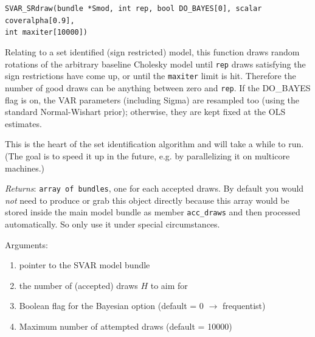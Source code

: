 \documentclass[a4paper,10pt]{article}
\newenvironment{funcdoc}[1]
{\noindent\hrulefill\newline\nopagebreak\texttt{#1}%
\nopagebreak\par\noindent\hrulefill%
\nopagebreak\par\nopagebreak\smallskip\nopagebreak\par}
{\bigskip}
\begin{document}
\begin{funcdoc}{SVAR\_SRdraw(bundle *Smod, int rep, bool
    DO\_BAYES[0], scalar coveralpha[0.9],\\
    int maxiter[10000])}
  
  Relating to a set identified (sign restricted) model, this function draws random 
  rotations of the arbitrary baseline Cholesky model
  until \texttt{rep} draws satisfying the sign restrictions have come up,
  or until the \texttt{maxiter} limit is hit. Therefore the number of good 
  draws can be anything between zero and \texttt{rep}.
  If the DO\_BAYES flag is on, the VAR parameters (including Sigma)
  are resampled too (using the standard Normal-Wishart prior); otherwise, 
  they are kept fixed at the OLS estimates. 
  
  This is the heart of the set identification algorithm 
  and will take a while to run. (The goal is to speed it up in the future, e.g. by 
  parallelizing it on multicore machines.)
  
  \emph{Returns}: \texttt{array of bundles}, one for each accepted draws. 
  By default you would \emph{not} need to produce or grab this object directly
  because this array would be stored inside the main model bundle as member 
  \texttt{acc\_draws} and then processed automatically. So only use it under 
  special circumstances.

Arguments:
\begin{enumerate}
\item pointer to the SVAR model bundle
\item the number of (accepted) draws $H$ to aim for
\item Boolean flag for the Bayesian option
  (default = 0 $\to$ frequentist)
\item Maximum number of attempted draws (default = 10000)
\end{enumerate}
\end{funcdoc}
\end{document}
